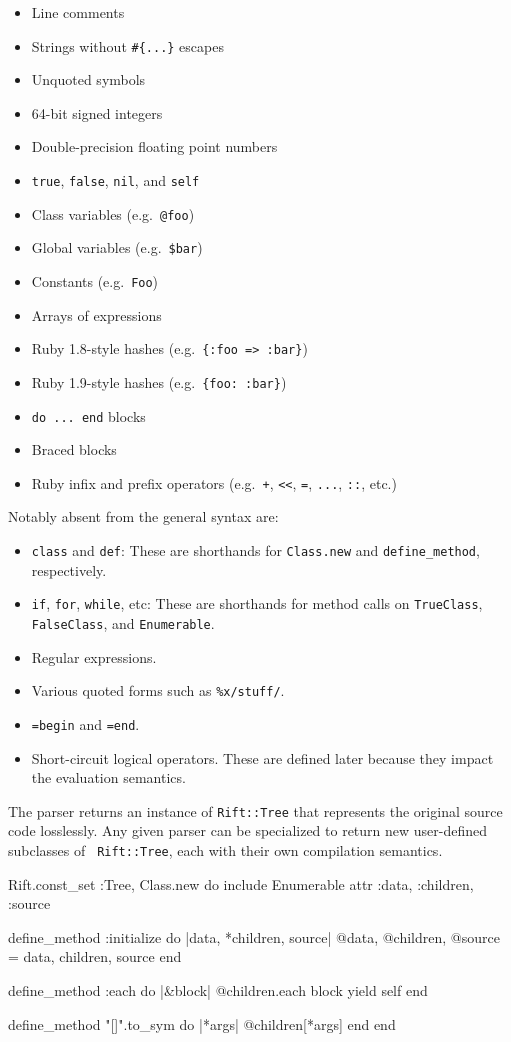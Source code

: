 \documentclass{report}
\begin{document}
\begin{itemize}
\item{Line comments}
\item{Strings without {\tt \#\{...\}} escapes}
\item{Unquoted symbols}
\item{64-bit signed integers}
\item{Double-precision floating point numbers}
\item{{\tt true}, {\tt false}, {\tt nil}, and {\tt self}}
\item{Class variables (e.g.~{\tt @foo})}
\item{Global variables (e.g.~{\tt \$bar})}
\item{Constants (e.g.~{\tt Foo})}
\item{Arrays of expressions}
\item{Ruby 1.8-style hashes (e.g.~{\tt \{:foo => :bar\}})}
\item{Ruby 1.9-style hashes (e.g.~{\tt \{foo:~:bar\}})}
\item{{\tt do ... end} blocks}
\item{Braced blocks}
\item{Ruby infix and prefix operators (e.g.~{\tt +}, {\tt <<}, {\tt =}, {\tt ...}, {\tt ::}, etc.)}
\end{itemize}

    Notably absent from the general syntax are:

\begin{itemize}
\item{{\tt class} and {\tt def}: These are shorthands for {\tt Class.new} and {\tt define\_method}, respectively.}
\item{{\tt if}, {\tt for}, {\tt while}, etc: These are shorthands for method calls on {\tt TrueClass}, {\tt FalseClass}, and {\tt Enumerable}.}
\item{Regular expressions.}
\item{Various quoted forms such as {\tt \%x/stuff/}.}
\item{{\tt =begin} and {\tt =end}.}
\item{Short-circuit logical operators. These are defined later because they impact the evaluation semantics.}
\end{itemize}

    The parser returns an instance of {\tt Rift::Tree} that represents the original source code losslessly. Any given parser can be specialized to return new user-defined subclasses of {\tt
    Rift::Tree}, each with their own compilation semantics.

\begin{rubycode}
Rift.const_set :Tree, Class.new do
  include Enumerable
  attr :data, :children, :source

  define_method :initialize do |data, *children, source|
    @data, @children, @source = data, children, source
  end

  define_method :each do |&block|
    @children.each block
    yield self
  end

  define_method "[]".to_sym do |*args|
    @children[*args]
  end
end \end{rubycode}
\end{document}
